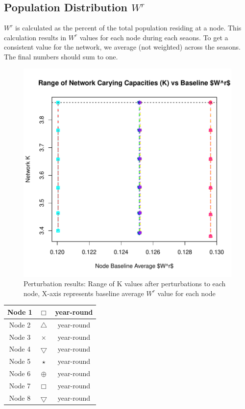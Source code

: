 \documentclass[10pt]{article}
\begin{document}
\newpage
\subsection{Population Distribution \texorpdfstring{$W^r$}{WR}}

$W^r$ is calculated as the percent of the total population residing at a node. This calculation results in $W^r$ values for each node during each seaons. To get a consistent value for the network, we average (not weighted) across the seasons. The final numbers should sum to one.


\vspace{-.5cm}
\begin{figure}[H]
\begin{center}
\includegraphics[width=.8\textwidth, height=.8\textwidth]{RGraphics-plant_barcr_WR}
\caption{Perturbation results: Range of K values after perturbations to each node, X-axis represents baseline average $W^r$ value for each node}\label{fig:plant_barcr_WR}
\end{center}
\end{figure}

\vspace{-.5cm}
\begin{tabular}{|c|c|c|}
\hline
{\color{red} Node 1} & $\Box$ & year-round \\
\hline
{\color{orange} Node 2} & $\triangle$ & year-round \\
\hline
{\color{yellow} Node 3} & $\times$ &  year-round \\
\hline
{\color{green} Node 4} & $\bigtriangledown$ & year-round \\
\hline
{\color{blue} Node 5} & $\star$ & year-round \\
\hline
{\color{purple} Node 6} & $\oplus$ & year-round \\
\hline
{\color{magenta} Node 7} & $\Box$ & year-round \\
\hline
{\color{cyan} Node 8} & $\bigtriangledown$ & year-round \\
\hline
\end{tabular}
\end{document}
